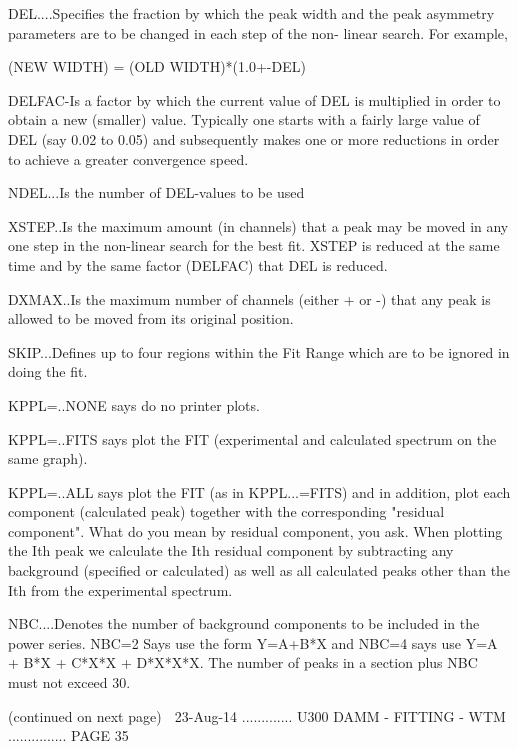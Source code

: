    DEL....Specifies  the  fraction  by  which  the  peak  width  and  the peak
          asymmetry parameters are to be changed in  each  step  of  the  non-
          linear search. For example,
 
                      (NEW WIDTH) = (OLD WIDTH)*(1.0+-DEL)
 
   DELFAC-Is  a  factor  by  which  the  current value of DEL is multiplied in
          order to obtain a new (smaller) value. Typically one starts  with  a
          fairly  large value of DEL (say 0.02 to 0.05) and subsequently makes
          one or more reductions in order to  achieve  a  greater  convergence
          speed.
 
   NDEL...Is the number of DEL-values to be used
 
   XSTEP..Is  the maximum amount (in channels) that a peak may be moved in any
          one step in the  non-linear  search  for  the  best  fit.  XSTEP  is
          reduced  at  the  same time and by the same factor (DELFAC) that DEL
          is reduced.
 
   DXMAX..Is the maximum number of channels (either + or -) that any  peak  is
          allowed to be moved from its original position.
 
   SKIP...Defines  up  to  four  regions  within the Fit Range which are to be
          ignored in doing the fit.
 
   KPPL=..NONE says do no printer plots.
 
   KPPL=..FITS says plot the FIT (experimental and calculated spectrum on  the
          same graph).
 
   KPPL=..ALL  says  plot  the  FIT (as in KPPL...=FITS) and in addition, plot
          each component (calculated peak)  together  with  the  corresponding
          "residual  component".  What  do you mean by residual component, you
          ask. When plotting the  Ith  peak  we  calculate  the  Ith  residual
          component  by  subtracting  any background (specified or calculated)
          as well as  all  calculated  peaks  other  than  the  Ith  from  the
          experimental spectrum.
 
   NBC....Denotes  the  number  of background components to be included in the
          power series. NBC=2 Says use the form Y=A+B*X  and  NBC=4  says  use
          Y=A  +  B*X + C*X*X + D*X*X*X. The number of peaks in a section plus
          NBC must not exceed 30.
 
                            (continued on next page)
    
   23-Aug-14 ............. U300  DAMM - FITTING - WTM ............... PAGE  35
 
